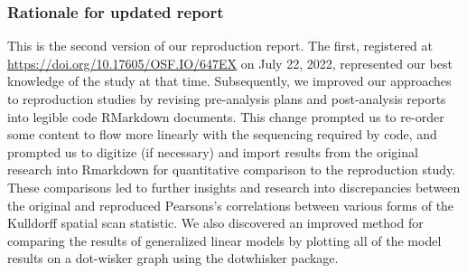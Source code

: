 \documentclass[
]{article}
\begin{document}
\hypertarget{rationale-for-updated-report}{%
\subsubsection{Rationale for updated
report}\label{rationale-for-updated-report}}

This is the second version of our reproduction report. The first,
registered at \url{https://doi.org/10.17605/OSF.IO/647EX} on July 22,
2022, represented our best knowledge of the study at that time.
Subsequently, we improved our approaches to reproduction studies by
revising pre-analysis plans and post-analysis reports into legible code
RMarkdown documents. This change prompted us to re-order some content to
flow more linearly with the sequencing required by code, and prompted us
to digitize (if necessary) and import results from the original research
into Rmarkdown for quantitative comparison to the reproduction study.
These comparisons led to further insights and research into
discrepancies between the original and reproduced Pearsons's
correlations between various forms of the Kulldorff spatial scan
statistic. We also discovered an improved method for comparing the
results of generalized linear models by plotting all of the model
results on a dot-wisker graph using the dotwhisker package.
\end{document}
